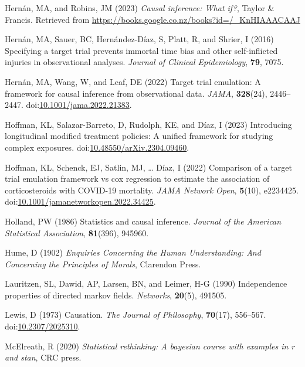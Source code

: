 \documentclass[
  singlecolumn,
  9pt]{article}
\newlength{\cslhangindent}
\newenvironment{CSLReferences}[2] %
 {\begin{list}{}{%
  \setlength{\itemindent}{0pt}
  \setlength{\leftmargin}{0pt}
  \setlength{\parsep}{0pt}
  \ifodd #1
   \setlength{\leftmargin}{\cslhangindent}
   \setlength{\itemindent}{-1\cslhangindent}
  \fi
  \setlength{\itemsep}{#2\baselineskip}}}
 {\end{list}}
\begin{document}
\begin{CSLReferences}{1}{0}
Hernán, MA, and Robins, JM (2023) \emph{Causal inference: What if?},
Taylor \& Francis. Retrieved from
\url{https://books.google.co.nz/books?id=/_KnHIAAACAAJ}

Hernán, MA, Sauer, BC, Hernández-Díaz, S, Platt, R, and Shrier, I (2016)
Specifying a target trial prevents immortal time bias and other
self-inflicted injuries in observational analyses. \emph{Journal of
Clinical Epidemiology}, \textbf{79}, 7075.

Hernán, MA, Wang, W, and Leaf, DE (2022) Target trial emulation: A
framework for causal inference from observational data. \emph{JAMA},
\textbf{328}(24), 2446--2447.
doi:\href{https://doi.org/10.1001/jama.2022.21383}{10.1001/jama.2022.21383}.

Hoffman, KL, Salazar-Barreto, D, Rudolph, KE, and Díaz, I (2023)
Introducing longitudinal modified treatment policies: A unified
framework for studying complex exposures.
doi:\href{https://doi.org/10.48550/arXiv.2304.09460}{10.48550/arXiv.2304.09460}.

Hoffman, KL, Schenck, EJ, Satlin, MJ, \ldots{} Díaz, I (2022) Comparison
of a target trial emulation framework vs cox regression to estimate the
association of corticosteroids with COVID-19 mortality. \emph{JAMA
Network Open}, \textbf{5}(10), e2234425.
doi:\href{https://doi.org/10.1001/jamanetworkopen.2022.34425}{10.1001/jamanetworkopen.2022.34425}.

Holland, PW (1986) Statistics and causal inference. \emph{Journal of the
American Statistical Association}, \textbf{81}(396), 945960.

Hume, D (1902) \emph{Enquiries Concerning the Human Understanding: And
Concerning the Principles of Morals}, Clarendon Press.

Lauritzen, SL, Dawid, AP, Larsen, BN, and Leimer, H-G (1990)
Independence properties of directed markov fields. \emph{Networks},
\textbf{20}(5), 491505.

Lewis, D (1973) Causation. \emph{The Journal of Philosophy},
\textbf{70}(17), 556--567.
doi:\href{https://doi.org/10.2307/2025310}{10.2307/2025310}.

McElreath, R (2020) \emph{Statistical rethinking: A bayesian course with
examples in r and stan}, CRC press.


\end{CSLReferences}
\end{document}
